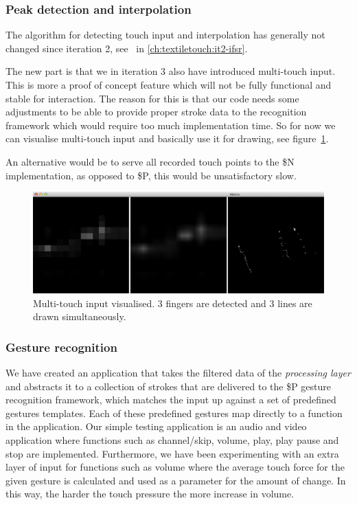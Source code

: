 \subsubsection{Peak detection and interpolation}
The algorithm for detecting touch input and interpolation has generally not changed since iteration 2, see~ in \ref{ch:textiletouch:it2-ifsr}.

The new part is that we in iteration 3 also have introduced multi-touch input.
This is more a proof of concept feature which will not be fully functional and stable for interaction. The reason for this is that our code needs some adjustments to be able to provide proper stroke data to the recognition framework which would require too much implementation time.
So for now we can visualise multi-touch input and basically use it for drawing, see figure~\ref{fig:textiletouch:multitouch}.

An alternative would be to serve all recorded touch points to the \$N implementation, as opposed to \$P,  this would be unsatisfactory slow.

\begin{figure}[h]
  \centering
      \includegraphics[width=.9\textwidth]{figures/touch/tt_multitouch}
  \caption[The data flow from sensor to application.]
   {Multi-touch input visualised. 3 fingers are detected and 3 lines are drawn simultaneously.}
   \label{fig:textiletouch:multitouch}
\end{figure}

\subsubsection{Gesture recognition} 
\label{ch:textiletouch:gesture_implementation}

We have created an application that takes the filtered data of the \emph{processing layer} and abstracts it to a collection of strokes that are delivered to the \$P gesture recognition framework, which matches the input up against a set of predefined gestures templates.
Each of these predefined gestures map directly to a function in the application.
Our simple testing application is an audio and video application where functions such as channel/skip, volume, play, play pause and stop are implemented.
Furthermore, we have been experimenting with an extra layer of input for functions such as volume where the average touch force for the given gesture is calculated and used as a parameter for the amount of change.
In this way, the harder the touch pressure the more increase in volume.

